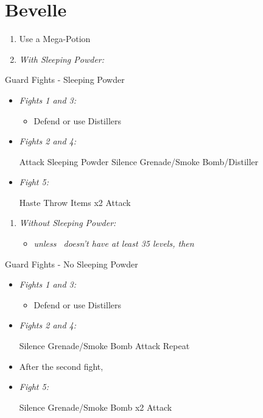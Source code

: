 \chapter{Bevelle}
\begin{enumerate}
	\item Use a Mega-Potion
	\item \textit{With Sleeping Powder:}
\end{enumerate}
\begin{battle}{Guard Fights - Sleeping Powder}
\begin{itemize}
	\item \textit{Fights 1 and 3:}
	\begin{itemize}
		\tidusf Attack
		\item Defend or use Distillers
	\end{itemize}
	\item \textit{Fights 2 and 4:}
	\begin{itemize}
		\tidusf Attack
		\rikkuf Sleeping Powder
		\kimahrif Silence Grenade/Smoke Bomb/Distiller
	\end{itemize}
	\item \textit{Fight 5:}
	\begin{itemize}
		\tidusf Haste \rikku
		\rikkuf Throw Items x2
		\tidusf Attack
	\end{itemize}
\end{itemize}
\end{battle}
\begin{enumerate}[resume]
	\item \textit{Without Sleeping Powder:}
	\begin{itemize}
	\item \formation{\tidus}{\rikku}{\auron} \textit{unless \lulu\ doesn't have at least 35 levels, then } \formation{\tidus}{\rikku}{\lulu}
	\end{itemize}
\end{enumerate}
\vfill
\begin{battle}{Guard Fights - No Sleeping Powder}
\begin{itemize}
	\item \textit{Fights 1 and 3:}
	\begin{itemize}
		\tidusf Attack
		\item Defend or use Distillers
	\end{itemize}
	\item \textit{Fights 2 and 4:}
	\begin{itemize}
		\switch{\tidus}{\kimahri}
		\kimahrif Silence Grenade/Smoke Bomb
		\switch{\rikku}{\tidus}
		\tidusf Attack
		\kimahrif Repeat
	\end{itemize}
	\item After the second fight, \formation{\tidus}{\rikku}{\lulu}
	\item \textit{Fight 5:}
	\begin{itemize}
		\switch{\tidus}{\rikku}
		\rikkuf Silence Grenade/Smoke Bomb x2
		\switch{\kimahri}{\tidus}
		\tidusf Attack
	\end{itemize}
\end{itemize}
\end{battle}
